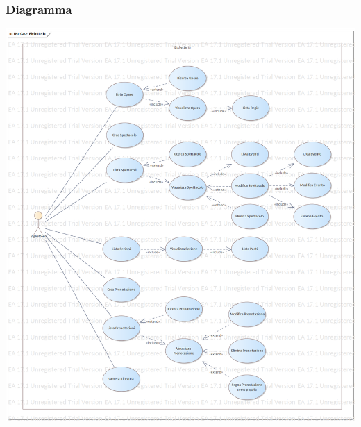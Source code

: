 \documentclass{article}
\begin{document}
            \subsubsection{Diagramma}
                \includegraphics[width=\textwidth]{imgs/use_case/biglietteria}
            
\end{document}
